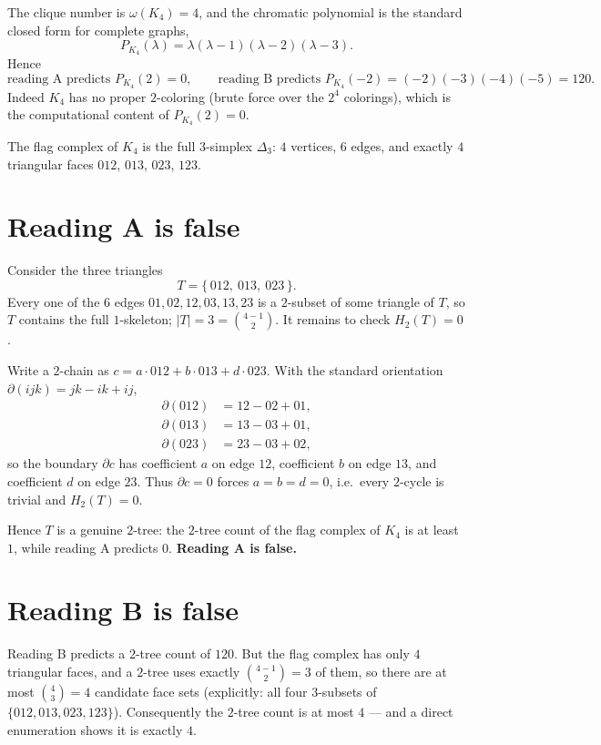 \documentclass[11pt]{article}
\begin{document}
The clique number is $\omega(K_4) = 4$, and the chromatic polynomial is the
standard closed form for complete graphs,
\[
P_{K_4}(\lambda) = \lambda(\lambda-1)(\lambda-2)(\lambda-3).
\]
Hence
\[
\text{reading A predicts } P_{K_4}(2) = 0, \qquad
\text{reading B predicts } P_{K_4}(-2) = (-2)(-3)(-4)(-5) = 120.
\]
Indeed $K_4$ has no proper $2$-coloring (brute force over the $2^4$ colorings),
which is the computational content of $P_{K_4}(2) = 0$.

The flag complex of $K_4$ is the full $3$-simplex $\Delta_3$: $4$ vertices,
$6$ edges, and exactly $4$ triangular faces
$012$, $013$, $023$, $123$.

\section{Reading A is false}

Consider the three triangles
\[
T = \{\,012,\ 013,\ 023\,\}.
\]
Every one of the $6$ edges $01, 02, 12, 03, 13, 23$ is a $2$-subset of some
triangle of $T$, so $T$ contains the full $1$-skeleton; $|T| = 3 =
\binom{4-1}{2}$.  It remains to check $H_2(T) = 0$.

Write a $2$-chain as $c = a\cdot 012 + b\cdot 013 + d\cdot 023$.  With the
standard orientation $\partial(ijk) = jk - ik + ij$,
\begin{align*}
\partial(012) &= 12 - 02 + 01,\\
\partial(013) &= 13 - 03 + 01,\\
\partial(023) &= 23 - 03 + 02,
\end{align*}
so the boundary $\partial c$ has coefficient $a$ on edge $12$, coefficient
$b$ on edge $13$, and coefficient $d$ on edge $23$.  Thus $\partial c = 0$
forces $a = b = d = 0$, i.e.\ every $2$-cycle is trivial and $H_2(T) = 0$.

Hence $T$ is a genuine $2$-tree: the $2$-tree count of the flag complex of
$K_4$ is at least $1$, while reading A predicts $0$.  \textbf{Reading A is
false.}

\section{Reading B is false}

Reading B predicts a $2$-tree count of $120$.  But the flag complex has only
$4$ triangular faces, and a $2$-tree uses exactly $\binom{4-1}{2} = 3$ of them,
so there are at most $\binom{4}{3} = 4$ candidate face sets (explicitly:
all four $3$-subsets of $\{012, 013, 023, 123\}$).  Consequently the $2$-tree
count is at most $4$ --- and a direct enumeration shows it is exactly $4$.
\end{document}
